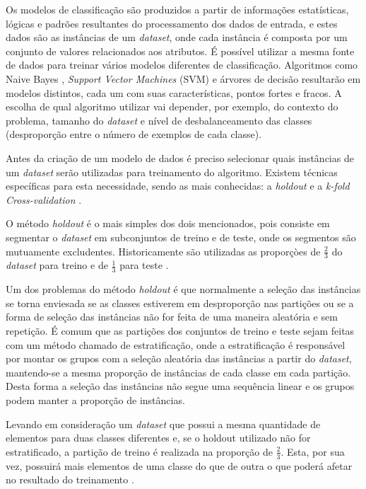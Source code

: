 Os modelos de classificação são produzidos a partir de informações estatísticas, lógicas e padrões resultantes do processamento dos dados de entrada, e estes dados são as instâncias de um \emph{dataset}, onde cada instância é composta por um conjunto de valores relacionados aos atributos. É possível utilizar a mesma fonte de dados para treinar vários modelos diferentes de classificação. Algoritmos como Naive Bayes \cite{Mccallum1998}, \emph{Support Vector Machines} (SVM) \cite{Meyer2017} e árvores de decisão \cite{Schmid2013} resultarão em modelos distintos, cada um com suas características, pontos fortes e fracos. A escolha de qual algoritmo utilizar vai depender, por exemplo, do contexto do problema, tamanho do \emph{dataset} e nível de desbalanceamento das classes (desproporção entre o número de exemplos de cada classe).

Antes da criação de um modelo de dados é preciso selecionar quais instâncias de um \emph{dataset} serão utilizadas para treinamento do algoritmo. Existem técnicas específicas para esta necessidade, sendo as mais conhecidas: a \emph{holdout} e a \emph{k-fold Cross-validation} \cite{Kohavi1995}.

O método \emph{holdout} é o mais simples dos dois mencionados, pois consiste em segmentar o \emph{dataset} em subconjuntos de treino e de teste, onde os segmentos são mutuamente excludentes. Historicamente são utilizadas as proporçòes de $\frac{2}{3}$ do \emph{dataset} para treino e de $\frac{1}{3}$ para teste \cite{Kohavi1995}.

Um dos problemas do método \emph{holdout} é que normalmente a seleção das instâncias se torna enviesada se as classes estiverem em desproporção nas partições ou se a forma de seleção das instâncias não for feita de uma maneira aleatória e sem repetição. É comum que as partições dos conjuntos de treino e teste sejam feitas com um método chamado de estratificação, onde a estratificação é responsável por montar os grupos com a seleção aleatória das instâncias a partir do \textit{dataset}, mantendo-se a mesma proporção de instâncias de cada classe em cada partição. Desta forma a seleção das instâncias não segue uma sequência linear e os grupos podem manter a proporção de instâncias.

Levando em consideração um \emph{dataset} que possui a mesma quantidade de elementos para duas classes diferentes e, se o holdout utilizado não for estratificado, a partição de treino é realizada na proporção de $\frac{2}{3}$. Esta, por sua vez, possuirá mais elementos de uma classe do que de outra o que poderá afetar no resultado do treinamento \cite{Witten2016}.

